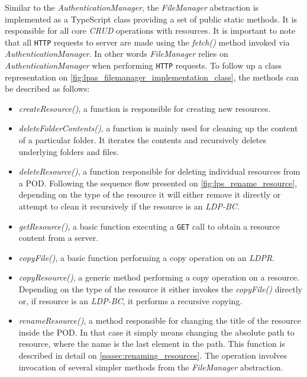 Similar to the \textit{AuthenticationManager}, the \textit{FileManager} abstraction is implemented as a TypeScript class providing a set of public static methods. It is responsible for all core \textit{CRUD} operations with \solid{} resources. It is important to note that all \texttt{HTTP} requests to \solid{} server are made using the \textit{fetch()} method invoked via \textit{AuthenticationManager}. In other words \textit{FileManager} relies on \textit{AuthenticationManager} when performing \texttt{HTTP} requests. To follow up a class representation on \autoref{fig:lpas_filemanager_implementation_class}, the methods can be described as follows:
\begin{itemize}
    \item \textit{createResource()}, a function is responsible for creating new \solid{} resources. 
    \item \textit{deleteFolderContents()}, a function is mainly used for cleaning up the content of a particular folder. It iterates the contents and recursively deletes underlying folders and files.
    \item \textit{deleteResource()}, a function responsible for deleting individual resources from a \solid{} POD. Following the sequence flow presented on \autoref{fig:lps_rename_resource}, depending on the type of the resource it will either remove it directly or attempt to clean it recursively if the resource is an \textit{LDP-BC}.
    \item \textit{getResource()}, a basic function executing a \texttt{GET} call to obtain a resource content from a \solid{} server.
    \item \textit{copyFile()}, a basic function performing a copy operation on an \textit{LDPR}.
    \item \textit{copyResource()}, a generic method performing a copy operation on a resource. Depending on the type of the resource it either invokes the \textit{copyFile()} directly or, if resource is an \textit{LDP-BC}, it performs a recursive copying.
    \item \textit{renameResource()}, a method responsible for changing the title of the resource inside the \solid{} POD. In that case it simply means changing the absolute path to resource, where the name is the last element in the path. This function is described in detail on \autoref{ssssec:renaming_resources}. The operation involves invocation of several simpler methods from the \textit{FileManager} abstraction.

\end{itemize}
